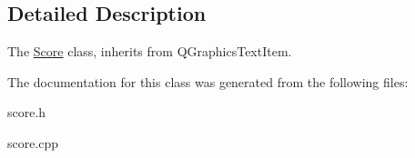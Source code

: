 \subsection{Detailed Description}
The \hyperlink{classScore}{Score} class, inherits from Q\+Graphics\+Text\+Item. 

The documentation for this class was generated from the following files\+:\begin{DoxyCompactItemize}
\item 
score.\+h\item 
score.\+cpp\end{DoxyCompactItemize}

